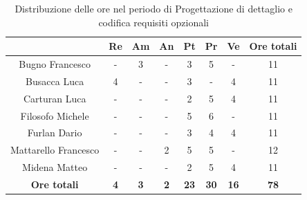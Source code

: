 \begin{table}[H]
  \centering
  \renewcommand{\arraystretch}{1.8}
  \begin{tabular}{c|c|c|c|c|c|c|c}
    \rowcolor[HTML]{125E28}
    \multicolumn{1}{c}{\color[HTML]{FFFFFF}\textbf{ Nominativo }}
                         & \multicolumn{1}{c}{\color[HTML]{FFFFFF}\textbf{ Re }}
                         & \multicolumn{1}{c}{\color[HTML]{FFFFFF}\textbf{ Am}}
                         & \multicolumn{1}{c}{\color[HTML]{FFFFFF}\textbf{ An }}
                         & \multicolumn{1}{c}{\color[HTML]{FFFFFF}\textbf{ Pt }}
                         & \multicolumn{1}{c}{\color[HTML]{FFFFFF}\textbf{ Pr }}
                         & \multicolumn{1}{c}{\color[HTML]{FFFFFF}\textbf{ Ve }}
                         & \multicolumn{1}{c}{\color[HTML]{FFFFFF}\textbf{ Ore totali }}                                                                                   \\
    \hline
    Bugno Francesco      & -                                                             & 3          & -          & 3           & 5           & -           & 11          \\
    Busacca Luca         & 4                                                             & -          & -          & 3           & -           & 4           & 11          \\
    Carturan Luca        & -                                                             & -          & -          & 2           & 5           & 4           & 11          \\
    Filosofo Michele     & -                                                             & -          & -          & 5           & 6           & -           & 11          \\
    Furlan Dario         & -                                                             & -          & -          & 3           & 4           & 4           & 11          \\
    Mattarello Francesco & -                                                             & -          & 2          & 5           & 5           & -           & 12          \\
    Midena Matteo        & -                                                             & -          & -          & 2           & 5           & 4           & 11          \\
    \textbf{Ore totali}  & \textbf{4}                                                    & \textbf{3} & \textbf{2} & \textbf{23} & \textbf{30} & \textbf{16} & \textbf{78}
  \end{tabular}
  \caption{Distribuzione delle ore nel periodo di Progettazione di dettaglio e codifica requisiti opzionali}
\end{table}

